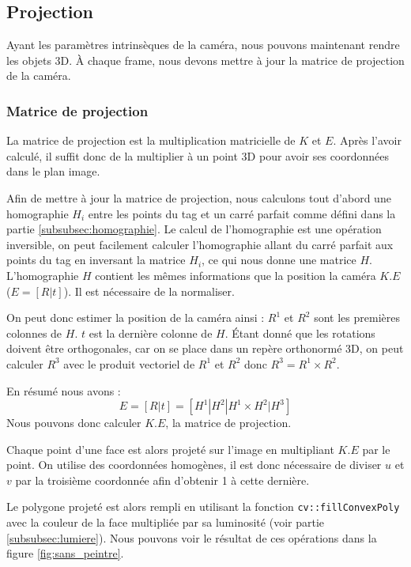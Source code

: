         \subsection{Projection}
        \label{subsec:projection}
            Ayant les paramètres intrinsèques de la caméra, nous pouvons maintenant rendre les objets 3D. À chaque frame, nous devons mettre à jour la matrice de projection de la caméra.

            \subsubsection{Matrice de projection}
                La matrice de projection est la multiplication matricielle de $K$ et $E$. Après l'avoir calculé, il suffit donc de la multiplier à un point 3D pour avoir ses coordonnées dans le plan image.

                Afin de mettre à jour la matrice de projection, nous calculons tout d'abord une homographie $H_i$ entre les points du tag et un carré parfait comme défini dans la partie \ref{subsubsec:homographie}. Le calcul de l'homographie est une opération inversible, on peut facilement calculer l'homographie allant du carré parfait aux points du tag en inversant la matrice $H_i$, ce qui nous donne une matrice $H$. L'homographie $H$ contient les mêmes informations que la position la caméra $K.E$ ($E = [R|t]$). Il est nécessaire de la normaliser. 

                On peut donc estimer la position de la caméra ainsi :
                $R^1$ et $R^2$ sont les premières colonnes de $H$. $t$ est la dernière colonne de $H$. Étant donné que les rotations doivent être orthogonales, car on se place dans un repère orthonormé 3D, on peut calculer $R^3$ avec le produit vectoriel de $R^1$ et $R^2$ donc $R^3 = R^1 \times R^2$.

                En résumé nous avons :
                \begin{equation*}
                    E = [R|t] = [H^1 | H^2 | H^1\times H^2 | H^3]
                \end{equation*}
                Nous pouvons donc calculer $K.E$, la matrice de projection.
                
                Chaque point d'une face est alors projeté sur l'image en multipliant $K.E$ par le point. On utilise des coordonnées homogènes, il est donc nécessaire de diviser $u$ et $v$ par la troisième coordonnée afin d'obtenir 1 à cette dernière. 

                Le polygone projeté est alors rempli en utilisant la fonction \verb|cv::fillConvexPoly| avec la couleur de la face multipliée par sa luminosité (voir partie \ref{subsubsec:lumiere}). Nous pouvons voir le résultat de ces opérations dans la figure \ref{fig:sans_peintre}.

